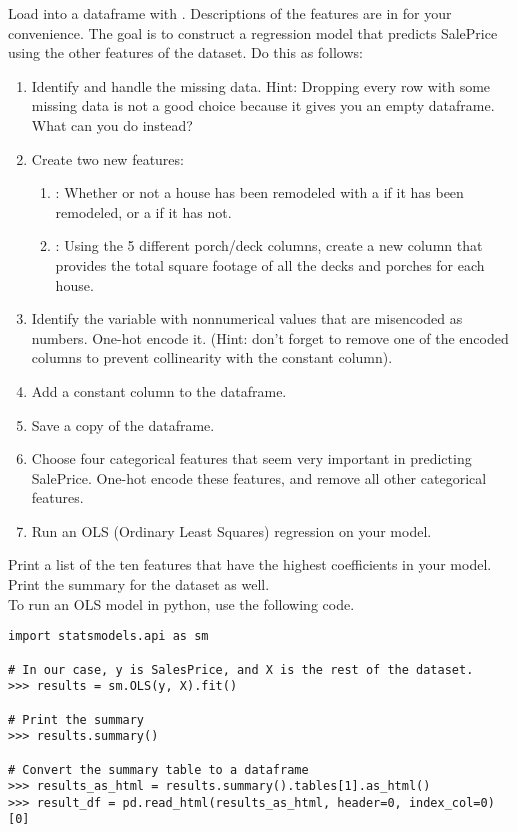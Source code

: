 \begin{problem}
\label{prob:boston-housing}
Load  into a dataframe with . Descriptions of the features are in  for your convenience.
The goal is to construct a regression model that predicts SalePrice using the other features of the dataset.  Do this as follows:

\begin{enumerate}
	\item Identify and handle the missing data.  Hint: Dropping every row with some missing data is not a good choice because it gives you an empty dataframe.  What can you do instead?

	\item Create two new features:
		\begin{enumerate}
			\item {}: Whether or not a house has been remodeled with a  if it has been remodeled, or a  if it has not.
			\item {}: Using the 5 different porch/deck columns, create a new column that provides the total square footage of all the decks and porches for each house.
		\end{enumerate}

	\item Identify the variable with nonnumerical values that are misencoded as numbers.  One-hot encode it. (Hint: don't forget to remove one of the encoded columns to prevent collinearity with the constant column).

    \item Add a constant column to the dataframe.

    \item Save a copy of the dataframe.

	\item Choose four categorical features that seem very important in predicting SalePrice. One-hot encode these features, and remove all other categorical features.

	\item Run an OLS (Ordinary Least Squares) regression on your model.
\end{enumerate}

Print a list of the ten features that have the highest coefficients in your model.
Print the summary for the dataset as well.
\\

\noindent To run an OLS model in python, use the following code.
\begin{lstlisting}
import statsmodels.api as sm

# In our case, y is SalesPrice, and X is the rest of the dataset.
>>> results = sm.OLS(y, X).fit()

# Print the summary
>>> results.summary()

# Convert the summary table to a dataframe
>>> results_as_html = results.summary().tables[1].as_html()
>>> result_df = pd.read_html(results_as_html, header=0, index_col=0)[0]
\end{lstlisting}
\label{prob:housing}
\end{problem}

